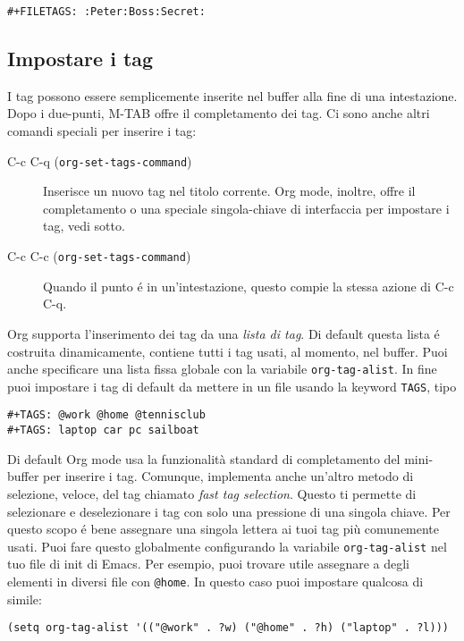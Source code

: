 \documentclass[11pt]{article}
\begin{document}
\begin{verbatim}
#+FILETAGS: :Peter:Boss:Secret:
\end{verbatim}

\subsection*{Impostare i tag}
\label{sec:orge2470ab}
I tag possono essere semplicemente inserite nel buffer alla fine di
una intestazione. Dopo i due-punti, M-TAB offre il completamento dei
tag. Ci sono anche altri comandi speciali per inserire i tag:

\begin{description}
\item[{C-c C-q (\texttt{org-set-tags-command})}] Inserisce un nuovo tag nel titolo corrente. Org mode, inoltre, offre
il completamento o una speciale singola-chiave di interfaccia per
impostare i tag, vedi sotto.

\item[{C-c C-c (\texttt{org-set-tags-command})}] Quando il punto é in un'intestazione, questo compie la stessa azione di
C-c C-q.
\end{description}

Org supporta l'inserimento dei tag da una \emph{lista di tag}. Di default
questa lista é costruita dinamicamente, contiene tutti i tag usati, al
momento, nel buffer. Puoi anche specificare una lista fissa globale
con la variabile \texttt{org-tag-alist}. In fine puoi impostare i tag di
default da mettere in un file usando la keyword \texttt{TAGS}, tipo

\begin{verbatim}
#+TAGS: @work @home @tennisclub
#+TAGS: laptop car pc sailboat
\end{verbatim}


Di default Org mode usa la funzionalità standard di completamento del mini-buffer per inserire i
tag. Comunque, implementa anche un'altro metodo di selezione, veloce, del tag chiamato \emph{fast tag
selection}. Questo ti permette di selezionare e deselezionare i tag con solo una pressione di
una singola chiave. Per questo scopo é bene assegnare una singola lettera ai tuoi tag più
comunemente usati. Puoi fare questo globalmente configurando la variabile \texttt{org-tag-alist} nel tuo file
di init di Emacs. Per esempio, puoi trovare utile assegnare a degli elementi in diversi file con
\texttt{@home}. In questo caso puoi impostare qualcosa di simile:

\begin{verbatim}
(setq org-tag-alist '(("@work" . ?w) ("@home" . ?h) ("laptop" . ?l)))
\end{verbatim}
\end{document}

